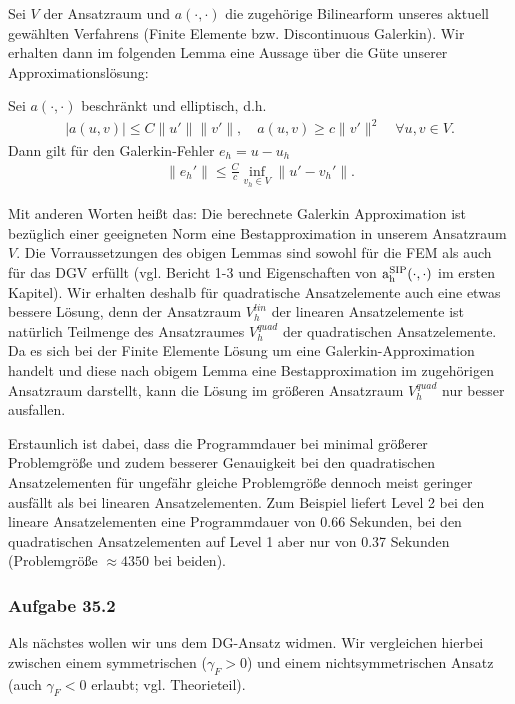 Sei $V$ der Ansatzraum und $a(\cdot,\cdot)$ die zugehörige Bilinearform unseres aktuell gewählten Verfahrens (Finite Elemente bzw. Discontinuous Galerkin).
Wir erhalten dann im folgenden Lemma eine Aussage über die Güte unserer Approximationslösung:

\begin{Lemma}
  Sei $a(\cdot,\cdot)$ beschränkt und elliptisch, d.h.
  \begin{align*}
    |a(u,v)| \le C \|u'\| \|v'\|, \quad a(u,v) \ge c \| v'\|^2
    \quad \forall u,v \in V.
  \end{align*}
  Dann gilt für den Galerkin-Fehler $e_h = u-u_h$
  \begin{align*}
    \| e_h' \| \le \frac{C}{c} \inf\limits_{v_h \in V}
    \| u'-v_h' \|.
  \end{align*}
\end{Lemma}
Mit anderen Worten heißt das: Die berechnete Galerkin Approximation ist bezüglich einer geeigneten Norm eine Bestapproximation in unserem Ansatzraum $V$.
Die Vorraussetzungen des obigen Lemmas sind sowohl für die FEM als auch für das DGV erfüllt (vgl. Bericht 1-3 und
Eigenschaften von $ \operatorname{a_h^{\text{SIP}}}(\cdot,\cdot) $ im ersten Kapitel).
Wir erhalten deshalb für quadratische Ansatzelemente auch eine etwas bessere Lösung, denn der Ansatzraum $V_h^{lin}$ der linearen Ansatzelemente ist natürlich Teilmenge des Ansatzraumes $V_h^{quad}$ der quadratischen Ansatzelemente. Da es sich bei der Finite Elemente Lösung um eine Galerkin-Approximation handelt und diese nach obigem Lemma eine Bestapproximation im zugehörigen Ansatzraum darstellt, kann die Lösung im größeren Ansatzraum $V_h^{quad}$ nur besser ausfallen.

Erstaunlich ist dabei, dass die Programmdauer bei minimal größerer Problemgröße und zudem besserer Genauigkeit bei den quadratischen Ansatzelementen für ungefähr gleiche Problemgröße dennoch meist geringer ausfällt als bei linearen Ansatzelementen. Zum Beispiel liefert Level 2 bei den lineare Ansatzelementen eine Programmdauer von 0.66 Sekunden, bei den quadratischen Ansatzelementen auf Level 1 aber nur von 0.37 Sekunden (Problemgröße $\approx 4350$ bei beiden).



\subsubsection{Aufgabe 35.2}
Als nächstes wollen wir uns dem DG-Ansatz widmen. Wir vergleichen hierbei  zwischen einem symmetrischen ($ \gamma_F  > 0$) und einem nichtsymmetrischen Ansatz (auch $ \gamma_F < 0 $ erlaubt; vgl. Theorieteil).

